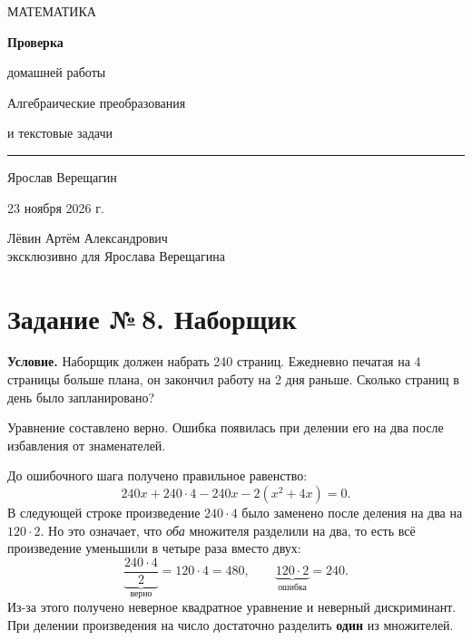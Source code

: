 \documentclass[a4paper,11pt]{article}
\newcommand{\accentsection}[1]{\vspace{1pt}{\large\bfseries\color{darkaccent}#1}\par\vspace{0pt}{\color{rulecolor}\rule{\linewidth}{0.5pt}}\vspace{1pt}}
\begin{document}
\thispagestyle{empty}
\begin{center}
\vspace*{23mm}
{\large\color{muted}МАТЕМАТИКА}\par
\vspace{18mm}
{\Huge\bfseries\color{darkaccent}Проверка\par домашней работы}\par
\vspace{9mm}
{\Large Алгебраические преобразования\par и текстовые задачи}\par
\vspace{17mm}
{\color{accent}\rule{0.68\linewidth}{0.8pt}}\par
\vspace{13mm}
{\large Ярослав Верещагин}\par
\vspace{4mm}
{\normalsize 23 ноября 2026 г.}\par
\end{center}
\vfill
\begin{center}
{\small\color{muted}Лёвин Артём Александрович\\
эксклюзивно для Ярослава Верещагина}
\end{center}
\vspace{11mm}
\clearpage

\section*{\color{accent}Задание №\,8. Наборщик}
\noindent\textbf{Условие.} Наборщик должен набрать 240 страниц. Ежедневно печатая на 4 страницы больше плана, он закончил работу на 2 дня раньше. Сколько страниц в день было запланировано?

\accentsection{Где возникла ошибка}
Уравнение составлено верно. Ошибка появилась при делении его на два после избавления от знаменателей.

До ошибочного шага получено правильное равенство:
\[
240x+240\cdot4-240x-2(x^2+4x)=0.
\]
В следующей строке произведение \(240\cdot4\) было заменено после деления на два на \(120\cdot2\). Но это означает, что \emph{оба} множителя разделили на два, то есть всё произведение уменьшили в четыре раза вместо двух:
\[
\underbrace{\frac{240\cdot4}{2}}_{\text{верно}}=120\cdot4=480,
\qquad
\underbrace{120\cdot2}_{\text{ошибка}}=240.
\]
Из-за этого получено неверное квадратное уравнение и неверный дискриминант. При делении произведения на число достаточно разделить \textbf{один} из множителей.
\end{document}

